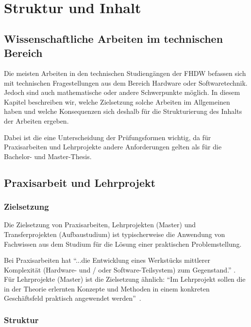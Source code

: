 \chapter{Struktur und Inhalt}
\label{chap:struktur-und-inhalt}


\section{Wissenschaftliche Arbeiten im technischen Bereich}

Die meisten Arbeiten in den technischen Studiengängen der FHDW befassen sich mit technischen Fragestellungen aus dem Bereich Hardware oder Softwaretechnik. Jedoch sind auch mathematische oder andere Schwerpunkte möglich. In diesem Kapitel beschreiben wir, welche Zielsetzung solche Arbeiten im Allgemeinen haben und welche Konsequenzen sich deshalb für die Strukturierung des Inhalts der Arbeiten ergeben.

Dabei ist die eine Unterscheidung der Prüfungsformen wichtig, da für Praxisarbeiten und Lehrprojekte andere Anforderungen gelten als für die Bachelor- und Master-Thesis.

\section{Praxisarbeit und Lehrprojekt}

\subsection{Zielsetzung}

Die Zielsetzung von Praxisarbeiten, Lehrprojekten (Master) und Transferprojekten (Aufbaustudium) ist typischerweise die Anwendung von Fachwissen aus dem Studium für die Lösung einer praktischen Problemstellung.

Bei Praxisarbeiten hat \enquote{...die Entwicklung eines Werkstücks mittlerer Komplexität
(Hardware- und / oder Software-Teilsystem) zum Gegenstand.} \cite[S.\,122]{FHDWModulhabdbuchBachelor}. Für Lehrprojekte (Master) ist die Zielsetzung ähnlich: \enquote{Im Lehrprojekt sollen die in der Theorie erlernten Konzepte und Methoden in einem konkreten Geschäftsfeld praktisch angewendet werden}~\cite[S.\,12]{FHDWModulhabdbuchMasterInformationEngineering}.

\subsection{Struktur}
\label{sec:struktur-projektbericht}


